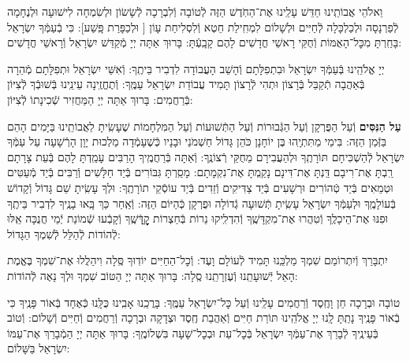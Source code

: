 \documentclass[twoside, openany, parskip=half, 11pt]{book}
\begin{document}
וֵאלֹהֵי אֲבוֹתֵֽינוּ חַדֵּשׁ עָלֵֽינוּ אֶת־הַחֹֽדֶשׁ הַזֶּה לְֿטוֹבָה וְֿלִבְרָכָה לְֿשָׂשׂוֹן וּלְשִׂמְחָה לִישׁוּעָה וּלְנֶחָמָה לְֿפַרְנָסָה וּלְכַלְכָּלָה לְֿחַיִּים וּלְשָׁלוֹם לִמְחִֽילַת חֵטְא וְֿלִסְלִיחַת עָוֹן [
וּלְכַפָּרַת פָּֽשַׁע]: כִּי בְֿעַמְּֿךָ יִשְׂרָאֵל בָּחַֽרְתָּ מִכׇּל־הָאֻמּוֹת וְֿחֻקֵּי רָאשֵׁי חֳדָשִׁים לָהֶם קָבָֽעְֿתָּ: בָּרוּךְ אַתָּה יְיָ מְֿקַדֵּשׁ יִשְׂרָאֵל וְֿרָאשֵׁי חֳדָשִׁים:

\nextpage
{}
יְיָ אֱלֹהֵֽינוּ בְּֿעַמְּֿךָ יִשְׂרָאֵל וּבִתְפִלָּתָם וְֿהָשֵׁב הָעֲבוֹדָה לִדְבִיר בֵּיתֶֽךָ: וְֿאִשֵּׁי יִשְׂרָאֵל וּתְפִלָּתָם מְֿהֵרָה בְּֿאַהֲבָה תְֿקַבֵּל בְּֿרָצוֹן וּתְהִי לְֿרָצוֹן תָּמִיד עֲבוֹדַת יִשְׂרָאֵל עַמֶּֽךָ: וְֿתֶחֱזֶֽינָה עֵינֵֽינוּ בְּֿשׁוּבְֿךָ לְֿצִיּוֹן בְּֿרַחֲמִים: בָּרוּךְ אַתָּה יְיָ הַמַּחֲזִיר שְֿׁכִינָתוֹ לְֿצִיּוֹן:

\modim

\enlargethispage{\baselineskip}

\begin{sometimes}

\textbf{עַל הַנִּסִּים}
וְֿעַל הַפֻּרְקָן וְֿעַל הַגְּֿבוּרוֹת וְֿעַל הַתְּֿשׁוּעוֹת וְֿעַל הַמִּלְחָמוֹת
שֶׁעָשִֽׂיתָ לַאֲבוֹתֵֽינוּ בַּיָּמִים הָהֵם בַּזְּֿמַן הַזֶּה:
בִּימֵי מַתִּתְיָֽהוּ בֶּן יוֹחָנָן כֹּהֵן גָּדוֹל חַשְׁמֹנַי וּבָנָיו כְּֿשֶׁעָמְֿדָה מַלְכוּת יָוָן הָרְֿשָׁעָה עַל עַמְּֿךָ יִשְׂרָאֵל לְֿהַשְׁכִּיחָם תּוֹרָתֶֽךָ וּלְהַעֲבִירָם מֵחֻקֵּי רְֿצוֹנֶֽךָ: וְֿאַתָּה בְּֿרַחֲמֶֽיךָ הָרַבִּים עָמַֽדְתָּ לָהֶם בְּֿעֵת צָרָתָם רַֽבְתָּ אֶת־רִיבָם דַּֽנְתָּ אֶת־דִּינָם נָקַֽמְתָּ אֶת־נִקְמָתָם: מָסַֽרְתָּ גִּבּוֹרִים בְּֿיַד חַלָּשִׁים וְֿרַבִּים בְּֿיַד מְֿעַטִּים וּטְמֵאִים בְּֿיַד טְֿהוֹרִים וּרְשָׁעִים בְּֿיַד צַדִּיקִים וְֿזֵדִים בְּֿיַד עוֹסְֿקֵי תוֹרָתֶֽךָ: וּלְךָ עָשִֽׂיתָ שֵׁם גָּדוֹל וְֿקָדוֹשׁ בְּֿעוֹלָמֶֽךָ וּלְעַמְּֿךָ יִשְׂרָאֵל עָשִֽׂיתָ תְּֿשׁוּעָה גְֿדוֹלָה וּפֻרְקָן כְּֿהַיּוֹם הַזֶּה: וְֿאַֽחַר כַּךְ בָּֽאוּ בָנֶֽיךָ לִדְבִיר בֵּיתֶֽךָ וּפִנּוּ אֶת־הֵיכָלֶֽךָ וְֿטִהֲרוּ אֶת־מִקְדָּשֶֽׁךָ וְֿהִדְלִֽיקוּ נֵרוֹת בְּֿחַצְרוֹת קׇׇׇׇׇׇׇׇׇׇׇׇׇׇָדְּֿשֶֽׁךָ וְֿקָבְֿעוּ שְֿׁמוֹנַת יְֿמֵי חֲנֻכָּה אֵֽלּוּ לְֿהוֹדוֹת לְֿהַלֵּל לְֿשִׁמְךָ הַגָּדוֹל:

\end{sometimes}

\nextpage

יִתְבָּרַךְ וְֿיִתְרוֹמַם שִׁמְךָ מַלְכֵּֽנוּ תָּמִיד לְֿעוֹלָם וָעֶד:
וְֿכׇל־הַחַיִּים יוֹדֽוּךָ סֶּֽלָה וִיהַלֲלוּ אֶת־שִׁמְךָ בֶּאֱמֶת הָאֵל יְֿשׁוּעָתֵֽנוּ וְֿעֶזְרָתֵֽנוּ סֶֽלָה: בָּרוּךְ אַתָּה יְיָ הַטּוֹב שִׁמְךָ וּלְךָ נָאֶה לְֿהוֹדוֹת:


טוֹבָה וּבְרָכָה חֵן וָחֶֽסֶד וְֿרַחֲמִים עָלֵֽינוּ וְֿעַל כׇּל־יִשְׂרָאֵל עַמֶּֽךָ: בָּרֲכֵֽנוּ אָבִֽינוּ כֻּלָּֽנוּ כְּֿאֶחָד בְּֿאוֹר פָּנֶֽיךָ כִּי בְֿאוֹר פָּנֶֽיךָ נָתַֽתָּ לָֽנוּ יְיָ אֱלֹהֵֽינוּ תּוֹרַת חַיִּים וְֿאַהֲבַת חֶֽסֶד וּצְדָקָה וּבְרָכָה וְֿרַחֲמִים וְֿחַיִּים וְֿשָׁלוֹם: וְֿטוֹב בְּֿעֵינֶֽיךָ לְֿבָרֵךְ אֶת־עַמְּֿךָ יִשְׂרָאֵל בְּֿכׇל־עֵת וּבְכׇל־שָׁעָה בִּשְׁלוֹמֶֽךָ: בָּרוּךְ אַתָּה יְיָ הַמְֿבָרֵךְ אֶת־עַמּוֹ יִשְׂרָאֵל בַּשָּׁלוֹם:
\end{document}
